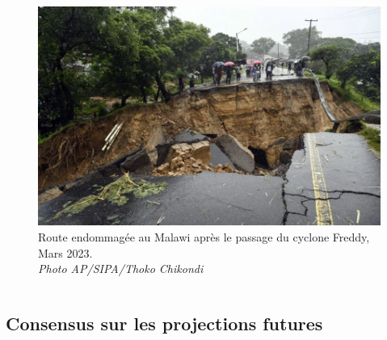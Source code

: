 \documentclass[aspectratio=169, usepdftitle=false, xcolor={dvipsnames}, 9pt,table]{beamer}
\begin{document}
\begin{frame}[c]
\begin{columns}
\begin{column}{0.45\textwidth}
\begin{figure}[h]
                 \centering
                 \includegraphics[width=\textwidth]{Figures/freddy_malawi_route.png}
                 \caption{Route endommagée au Malawi après le passage du cyclone Freddy, Mars 2023.\\\textit{Photo AP/SIPA/Thoko Chikondi}}
             \end{figure}
        \end{column}
    \end{columns}
\end{frame}

\subsection{Consensus sur les projections futures}
\end{document}
